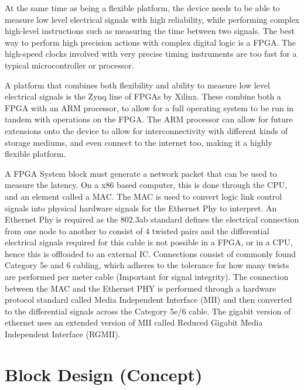 At the same time as being a flexible platform, the device needs to be able to measure low level electrical signals 
with high reliability, while performing complex high-level instructions such as measuring the time between two 
signals. The best way to perform high precision actions with complex digital logic is a FPGA. The high-speed clocks 
involved with very precise timing instruments are too fast for a typical microcontroller or processor. 

A platform that combines both flexibility and ability to measure low level electrical signals is the Zynq line of 
FPGAs by Xilinx. These combine both a FPGA with an ARM processor, to allow for a full operating system to be run in 
tandem with operations on the FPGA.  The ARM processor can allow for future extensions onto the device to allow for 
interconnectivity with different kinds of storage mediums, and even connect to the internet too, making it a highly 
flexible platform. 

A FPGA System block must generate a network packet that can be used to measure the latency. On a x86 based computer, 
this is done through the CPU, and an element called a MAC. The MAC is used to convert logic link control signals 
into physical hardware signals for the Ethernet Phy to interpret. An Ethernet Phy is required as the 802.3ab 
standard defines the electrical connection from one node to another to consist of 4 twisted pairs and the 
differential electrical signals required for this cable is not possible in a FPGA, or in a CPU, hence this is 
offloaded to an external IC. Connections consist of commonly found Category 5e and 6 cabling, which adheres to the 
tolerance for how many twists are performed per meter cable (Important for signal integrity). The connection between 
the MAC and the Ethernet PHY is performed through a hardware protocol standard called Media Independent Interface 
(MII) and then converted to the differential signals across the Category 5e/6 cable. The gigabit version of ethernet 
uses an extended version of MII called Reduced Gigabit Media Independent Interface (RGMII).

\section{Block Design (Concept)}

